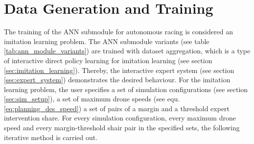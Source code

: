 \begin{table}[h]
\begin{tabular}{|l|l|r|r|r|}
    \end{tabular}
\end{table}

\section{Data Generation and Training} \label{sec:training}
The training of the ANN submodule
for autonomous racing is considered 
an imitation learning problem.
The ANN submodule variants
(see table \ref{tab:ann_module_variants})
are trained with dataset aggregation,
which is a type of interactive direct policy learning
for imitation learning (see section \ref{sec:imitation_learning}).
Thereby, the interactive expert system (see section \ref{sec:expert_system})
demonstrates the desired behaviour.
For the imitation learning problem,
the user specifies a set of 
simulation configurations (see section \ref{sec:sim_setup}),
a set of maximum drone speeds (see equ. \ref{eq:planning_des_speed})
a set of pairs of a margin and a threshold expert intervention share.
For every simulation configuration,
every maximum drone speed 
and every margin-threshold shair pair in the specified sets,
the following iterative method is carried out.
